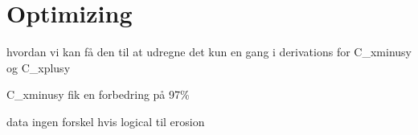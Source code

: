 \chapter{Optimizing}


hvordan vi kan få den til at udregne det kun en gang i derivations for C\_xminusy og C\_xplusy

C\_xminusy fik en forbedring på 97\%


data ingen forskel hvis logical til erosion